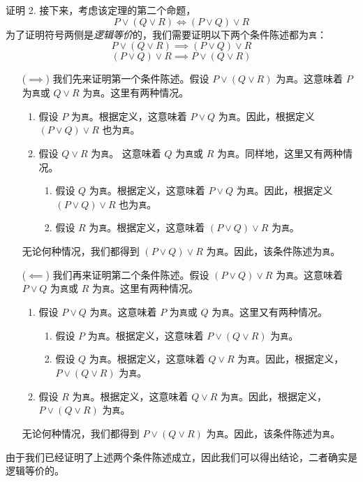 \begin{proofs}{证明 2. }
    接下来，考虑该定理的第二个命题，
    \[P \lor (Q \lor R) \iff (P \lor Q) \lor R\]
    为了证明符号两侧是\emph{逻辑等价}的，我们需要证明以下两个条件陈述都为\verb|真|：
    \[P \lor (Q \lor R) \implies (P \lor Q) \lor R\]
    \[(P \lor Q) \lor R \implies P \lor (Q \lor R)\]
    \begin{itemize}
        \item[($\implies$)] 我们先来证明第一个条件陈述。假设 $P \lor (Q \lor R)$ 为\verb|真|。这意味着 $P$ 为\verb|真|或 $Q \lor R$ 为\verb|真|。这里有两种情况。
        \begin{enumerate}
            \item 假设 $P$ 为\verb|真|。根据定义，这意味着 $P \lor Q$ 为\verb|真|。因此，根据定义 $(P \lor Q) \lor R$ 也为\verb|真|。
            \item 假设 $Q \lor R$ 为\verb|真|。 这意味着 $Q$ 为\verb|真|或 $R$ 为\verb|真|。同样地，这里又有两种情况。
            \begin{enumerate}[label=(\alph*)]
                \item 假设 $Q$ 为\verb|真|。根据定义，这意味着 $P \lor Q$ 为\verb|真|。因此，根据定义 $(P \lor Q) \lor R$ 也为\verb|真|。
                \item 假设 $R$ 为\verb|真|。根据定义，这意味着 $(P \lor Q) \lor R$ 为\verb|真|。
            \end{enumerate}
        \end{enumerate} 
        无论何种情况，我们都得到 $(P \lor Q) \lor R$ 为\verb|真|。因此，该条件陈述为\verb|真|。
        \item[($\impliedby$)] 我们再来证明第二个条件陈述。假设 $(P \lor Q) \lor R$ 为\verb|真|。这意味着 $P \lor Q$ 为\verb|真|或 $R$ 为\verb|真|。这里有两种情况。
        \begin{enumerate}
            \item 假设 $P \lor Q$ 为\verb|真|。这意味着 $P$ 为\verb|真|或 $Q$ 为\verb|真|。这里又有两种情况。
            \begin{enumerate}[label=(\alph*)]
                \item 假设 $P$ 为\verb|真|。根据定义，这意味着 $P \lor (Q \lor R)$ 为\verb|真|。
                \item 假设 $Q$ 为\verb|真|。根据定义，这意味着 $Q \lor R$ 为\verb|真|。因此，根据定义，$P \lor (Q \lor R)$ 为\verb|真|。
            \end{enumerate}
            \item 假设 $R$ 为\verb|真|。根据定义，这意味着 $Q \lor R$ 为\verb|真|。因此，根据定义，$P \lor (Q \lor R)$ 为\verb|真|。
        \end{enumerate}   
        无论何种情况，我们都得到 $P \lor (Q \lor R)$ 为\verb|真|。因此，该条件陈述为\verb|真|。 
    \end{itemize}
    由于我们已经证明了上述两个条件陈述成立，因此我们可以得出结论，二者确实是逻辑等价的。
\end{proofs}

